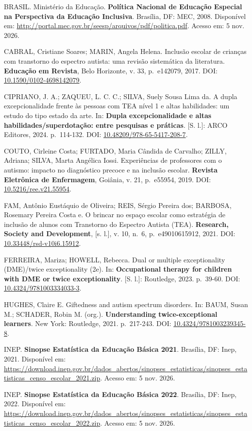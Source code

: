 BRASIL. Ministério da Educação. \textbf{Política Nacional de Educação
Especial na Perspectiva da Educação Inclusiva}. Brasília, DF: MEC, 2008.
Disponível em: \url{http://portal.mec.gov.br/seesp/arquivos/pdf/politica.pdf}.
Acesso em: 5 nov. 2026.

CABRAL, Cristiane Soares; MARIN, Angela Helena. Inclusão escolar de
crianças com transtorno do espectro autista: uma revisão sistemática da
literatura. \textbf{Educação em Revista}, Belo Horizonte, v. 33,
p.~e142079, 2017. DOI: \url{10.1590/0102-4698142079}.

CIPRIANO, J. A.; ZAQUEU, L. C. C.; SILVA, Suely Sousa Lima da. A dupla
excepcionalidade frente às pessoas com TEA nível 1 e altas habilidades:
um estudo do tipo estado da arte. In: \textbf{Dupla excepcionalidade e
altas habilidades/superdotação: entre pesquisas e práticas}. {[}S.
l.{]}: ARCO Editores, 2024. p.~114-132. DOI: \url{10.48209/978-65-5417-208-7}.

COUTO, Cirleine Costa; FURTADO, Maria Cândida de Carvalho; ZILLY,
Adriana; SILVA, Marta Angélica Iossi. Experiências de professores com o
autismo: impacto no diagnóstico precoce e na inclusão escolar.
\textbf{Revista Eletrônica de Enfermagem}, Goiânia, v. 21, p.~e55954,
2019. DOI: \url{10.5216/ree.v21.55954}.

FAM, Antônio Eustáquio de Oliveira; REIS, Sérgio Pereira dos; BARBOSA,
Rosemary Pereira Costa e. O brincar no espaço escolar como estratégia de
inclusão de alunos com Transtorno do Espectro Autista (TEA).
\textbf{Research, Society and Development}, {[}s. l.{]}, v. 10, n.~6,
p.~e49010615912, 2021. DOI: \url{10.33448/rsd-v10i6.15912}.

FERREIRA, Mariza; HOWELL, Rebecca. Dual or multiple exceptionality
(DME)/twice exceptionality (2e). In: \textbf{Occupational therapy for
children with DME or twice exceptionality}. {[}S. l.{]}: Routledge,
2023. p.~39-60. DOI: \url{10.4324/9781003334033-3}.

HUGHES, Claire E. Giftedness and autism spectrum disorders. In: BAUM,
Susan M.; SCHADER, Robin M. (org.). \textbf{Understanding
twice-exceptional learners}. New York: Routledge, 2021. p.~217-243. DOI:
\url{10.4324/9781003239345-8}.

INEP. \textbf{Sinopse Estatística da Educação Básica 2021}. Brasília,
DF: Inep, 2021. Disponível em:
\url{https://download.inep.gov.br/dados_abertos/sinopses_estatisticas/sinopses_estatisticas_censo_escolar_2021.zip}.
Acesso em: 5 nov. 2026.

INEP. \textbf{Sinopse Estatística da Educação Básica 2022}. Brasília,
DF: Inep, 2022. Disponível em:
\url{https://download.inep.gov.br/dados_abertos/sinopses_estatisticas/sinopses_estatisticas_censo_escolar_2022.zip}.
Acesso em: 5 nov. 2026.

